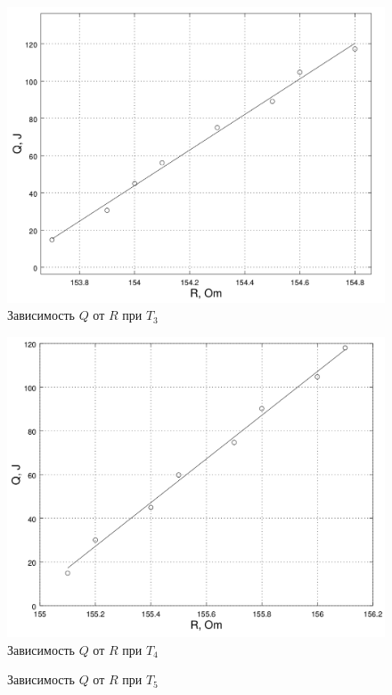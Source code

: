 \documentclass[20pt]{article}
\begin{document}
\begin{figure}[H]
	\centering
	\caption{Зависимость $Q$ от $R$ при $T_3$}
	\includegraphics[scale=0.25]{t3.png}
\end{figure}\begin{figure}[H]
	\centering
	\caption{Зависимость $Q$ от $R$ при $T_4$}
	\includegraphics[scale=0.25]{t4.png}
\end{figure}\begin{figure}[H]
	\centering
	\caption{Зависимость $Q$ от $R$ при $T_5$}

\end{figure}
\end{document}
